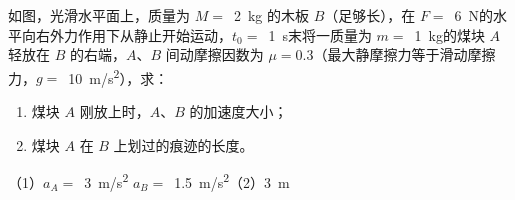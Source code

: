 如图，光滑水平面上，质量为 \(M =\) \,\qty{2}{kg} 的木板 \(B\)（足够长），在 \(F =\) \,\qty{6}{N}的水平向右外力作用下从静止开始运动，\(t_0 =\) \,\qty{1}{s}末将一质量为 \(m =\) \,\qty{1}{kg}的煤块 \(A\) 轻放在 \(B\) 的右端，\(A\)、\(B\) 间动摩擦因数为 \(\mu = 0.3\)（最大静摩擦力等于滑动摩擦力，\(g =\) \,\qty{10}{m/s^2}），求：
\begin{enumerate}
	\item 煤块 \(A\) 刚放上时，\(A\)、\(B\) 的加速度大小；
	\item 煤块 \(A\) 在 \(B\) 上划过的痕迹的长度。
\end{enumerate}

\begin{answer}
	（1）\(a_A =\) \,\qty{3}{m/s^2} \(a_B =\) \,\qty{1.5}{m/s^2}（2）\qty{3}{m}
\end{answer}